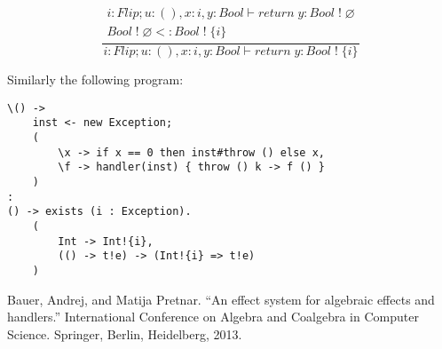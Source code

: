 \documentclass[12pt]{article}
\newcommand\tunit[0]{()}
\newcommand\aty[2]{#1 \; ! \; #2}
\newcommand\creturn[1]{\textit{return} \; #1}
\newcommand\subty[2]{#1 <: #2}
\begin{document}
\[\frac{
\begin{array}{l}
i:Flip;u:\tunit,x:i,y:Bool \vdash \creturn{y} : \aty{Bool}{\varnothing} \\
\subty{\aty{Bool}{\varnothing}}{\aty{Bool}{\{i\}}}
\end{array}
}{
i:Flip;u:\tunit,x:i,y:Bool \vdash \creturn{y} : \aty{Bool}{\{i\}}
}\]

Similarly the following program:
\begin{verbatim}
\() ->
	inst <- new Exception;
	(
		\x -> if x == 0 then inst#throw () else x,
		\f -> handler(inst) { throw () k -> f () }
	)
:
() -> exists (i : Exception).
	(
		Int -> Int!{i},
		(() -> t!e) -> (Int!{i} => t!e)
	)
\end{verbatim}

\begin{thebibliography}{9}
Bauer, Andrej, and Matija Pretnar. ``An effect system for algebraic effects and handlers.'' International Conference on Algebra and Coalgebra in Computer Science. Springer, Berlin, Heidelberg, 2013.
\end{thebibliography}
\end{document}
